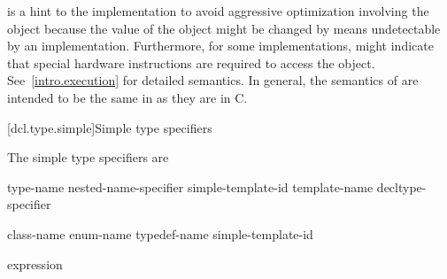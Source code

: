 \pnum
{}%
%
\begin{note}
 is a hint to the implementation to avoid aggressive
optimization involving the object because the value of the object might
be changed by means undetectable by an implementation.
Furthermore, for some implementations,  might indicate that
special hardware instructions are required to access the object.
See~\ref{intro.execution} for detailed semantics. In general, the
semantics of  are intended to be the same in \Cpp{} as
they are in C.
\end{note}

[dcl.type.simple]{Simple type specifiers}%

\pnum
The simple type specifiers are

\begin{bnf}
\br
     type-name\br
    nested-name-specifier  simple-template-id\br
     template-name\br
    \br
    \br
    \br
    \br
    \br
    \br
    \br
    \br
    \br
    \br
    \br
    \br
    \br
    \br
    decltype-specifier
\end{bnf}

\begin{bnf}
\br
    class-name\br
    enum-name\br
    typedef-name\br
    simple-template-id
\end{bnf}

\begin{bnf}
\br
   \terminal{(} expression \terminal{)}\br
   \terminal{(}  \terminal{)}
\end{bnf}

